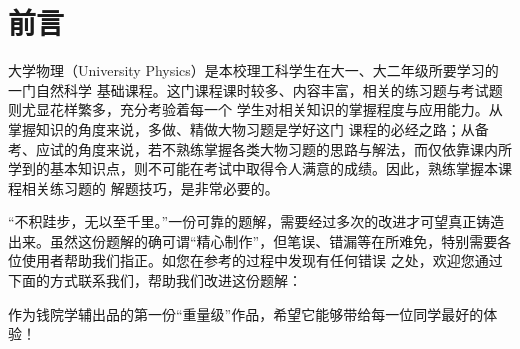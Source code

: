 \maketitle
\pagestyle{plain}
\chapter*{前言}
大学物理（University Physics）是本校理工科学生在大一、大二年级所要学习的一门自然科学
基础课程。这门课程课时较多、内容丰富，相关的练习题与考试题则尤显花样繁多，充分考验着每一个
学生对相关知识的掌握程度与应用能力。从掌握知识的角度来说，多做、精做大物习题是学好这门
课程的必经之路；从备考、应试的角度来说，若不熟练掌握各类大物习题的思路与解法，而仅依靠课内所
学到的基本知识点，则不可能在考试中取得令人满意的成绩。因此，熟练掌握本课程相关练习题的
解题技巧，是非常必要的。

“不积跬步，无以至千里。”一份可靠的题解，需要经过多次的改进才可望真正铸造出来。虽然这份题解的确可谓“精心制作”，但笔误、错漏等在所难免，特别需要各位使用者帮助我们指正。如您在参考的过程中发现有任何错误
之处，欢迎您通过下面的方式联系我们，帮助我们改进这份题解：

作为钱院学辅出品的第一份“重量级”作品，希望它能够带给每一位同学最好的体验！

